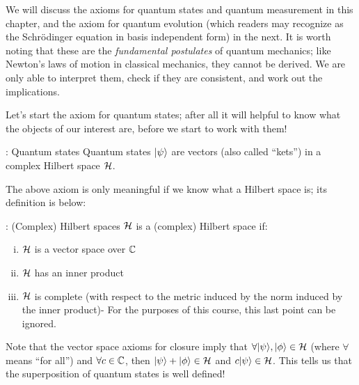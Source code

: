 We will discuss the axioms for quantum states and quantum measurement in this chapter, and the axiom for quantum evolution (which readers may recognize as the Schr\"{o}dinger equation in basis independent form) in the next. It is worth noting that these are the \emph{fundamental postulates} of quantum mechanics; like Newton's laws of motion in classical mechanics, they cannot be derived. We are only able to interpret them, check if they are consistent, and work out the implications.

Let's start the axiom for quantum states; after all it will helpful to know what the objects of our interest are, before we start to work with them! 

\begin{axiombox}{: Quantum states}\label{axiom-states}
    Quantum states $\lvert \psi \rangle$ are vectors (also called ``kets'') in a complex Hilbert space $\mathcal{H}$.
\end{axiombox}

The above axiom is only meaningful if we know what a Hilbert space is; its definition is below:

\begin{defbox}{: (Complex) Hilbert spaces}\label{def-Hilbertspaces}
    $\mathcal{H}$ is a (complex) Hilbert space if:
    \begin{enumerate}[(i)]
        \item $\mathcal{H}$ is a vector space over $\mathbb{C}$
        \item $\mathcal{H}$ has an inner product
        \item $\mathcal{H}$ is complete (with respect to the metric induced by the norm induced by the inner product)\footnotemark - For the purposes of this course, this last point can be ignored.
    \end{enumerate}
\end{defbox}

Note that the vector space axioms for closure imply that $\forall \ket{\psi}, \ket{\phi} \in \H$ (where $\forall$ means ``for all'') and $\forall c \in \mathbb{C}$, then $\ket{\psi} + \ket{\phi} \in \H$ and $c\lvert \psi \rangle \in \mathcal{H}$. This tells us that the superposition of quantum states is well defined!

